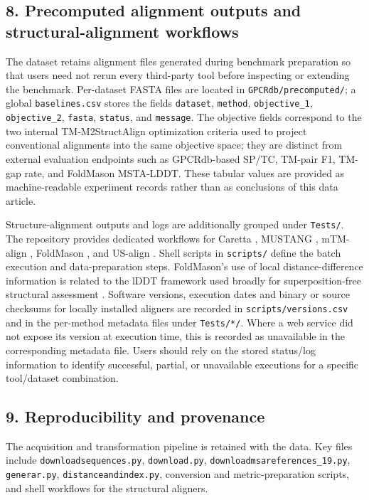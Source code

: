 \documentclass[a4paper,12pt]{article}
\begin{document}
	\subsection*{8. Precomputed alignment outputs and structural-alignment workflows}
	The dataset retains alignment files generated during benchmark preparation so that users need not rerun every third-party tool before inspecting or extending the benchmark. Per-dataset FASTA files are located in \texttt{GPCRdb/precomputed/}; a global \texttt{baselines.csv} stores the fields \texttt{dataset}, \texttt{method}, \texttt{objective\_1}, \texttt{objective\_2}, \texttt{fasta}, \texttt{status}, and \texttt{message}. The objective fields correspond to the two internal TM-M2StructAlign optimization criteria used to project conventional alignments into the same objective space; they are distinct from external evaluation endpoints such as GPCRdb-based SP/TC, TM-pair F1, TM-gap rate, and FoldMason MSTA-LDDT. These tabular values are provided as machine-readable experiment records rather than as conclusions of this data article.
	
	Structure-alignment outputs and logs are additionally grouped under \texttt{Tests/}. The repository provides dedicated workflows for Caretta \cite{akdel2020caretta}, MUSTANG \cite{konagurthu2006mustang}, mTM-align \cite{dong2018mtmalign}, FoldMason \cite{gilchrist2026foldmason}, and US-align \cite{zhang2022usalign}. Shell scripts in \texttt{scripts/} define the batch execution and data-preparation steps. FoldMason's use of local distance-difference information is related to the lDDT framework used broadly for superposition-free structural assessment \cite{mariani2013lddt}. Software versions, execution dates and binary or source checksums for locally installed aligners are recorded in \texttt{scripts/versions.csv} and in the per-method metadata files under \texttt{Tests/*/}. Where a web service did not expose its version at execution time, this is recorded as unavailable in the corresponding metadata file. Users should rely on the stored status/log information to identify successful, partial, or unavailable executions for a specific tool/dataset combination.
	
	\subsection*{9. Reproducibility and provenance}
	The acquisition and transformation pipeline is retained with the data. Key files include \texttt{downloadsequences.py}, \texttt{download.py}, \texttt{downloadmsareferences\_19.py}, \texttt{generar.py}, \texttt{distanceandindex.py}, conversion and metric-preparation scripts, and shell workflows for the structural aligners.
	
\end{document}
